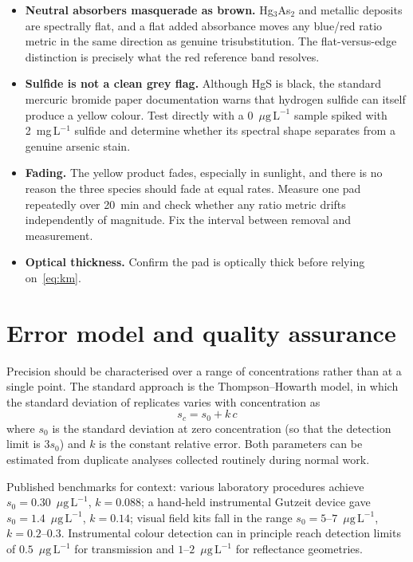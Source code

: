 \documentclass[11pt,a4paper]{article}
\newcommand{\ptl}{\ensuremath{\mu\mathrm{g\,L^{-1}}}}
\begin{document}
\begin{itemize}[nosep]
  \item \textbf{Neutral absorbers masquerade as brown.} Hg$_3$As$_2$ and
        metallic deposits are spectrally flat, and a flat added absorbance
        moves any blue/red ratio metric in the same direction as genuine
        trisubstitution. The flat-versus-edge distinction is precisely what
        the red reference band resolves.
  \item \textbf{Sulfide is not a clean grey flag.} Although HgS is black,
        the standard mercuric bromide paper documentation warns that
        hydrogen sulfide can itself produce a yellow colour. Test directly
        with a 0~\ptl{} sample spiked with 2~mg\,L$^{-1}$ sulfide and
        determine whether its spectral shape separates from a genuine
        arsenic stain.
  \item \textbf{Fading.} The yellow product fades, especially in sunlight,
        and there is no reason the three species should fade at equal rates.
        Measure one pad repeatedly over 20~min and check whether any ratio
        metric drifts independently of magnitude. Fix the interval between
        removal and measurement.
  \item \textbf{Optical thickness.} Confirm the pad is optically thick
        before relying on~\eqref{eq:km}.
\end{itemize}

\section{Error model and quality assurance}

Precision should be characterised over a range of concentrations rather than
at a single point. The standard approach is the Thompson--Howarth model, in
which the standard deviation of replicates varies with concentration as
\begin{equation}
  s_c = s_0 + k\,c
  \label{eq:th}
\end{equation}
where $s_0$ is the standard deviation at zero concentration (so that the
detection limit is $3s_0$) and $k$ is the constant relative error. Both
parameters can be estimated from duplicate analyses collected routinely
during normal work.

Published benchmarks for context: various laboratory procedures achieve
$s_0 = 0.30$~\ptl{}, $k = 0.088$; a hand-held instrumental Gutzeit device
gave $s_0 = 1.4$~\ptl{}, $k = 0.14$; visual field kits fall in the range
$s_0 = 5$--$7$~\ptl{}, $k = 0.2$--$0.3$. Instrumental colour detection can
in principle reach detection limits of $0.5$~\ptl{} for transmission and
$1$--$2$~\ptl{} for reflectance geometries.
\end{document}
